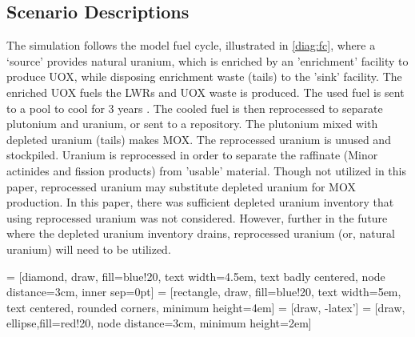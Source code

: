 \subsection{Scenario Descriptions}
The simulation follows the model fuel cycle, illustrated in \cref{diag:fc},
where a `source' provides natural uranium, which is enriched by an 'enrichment'
facility to produce \gls{UOX}, while disposing enrichment waste (tails)
to the 'sink' facility. The enriched \gls{UOX} fuels
the \gls{LWR}s and \gls{UOX} waste is produced. The used fuel
is sent to a pool to cool for 3 years \cite{carre_overview_2009}.
The cooled fuel is then reprocessed to separate plutonium and uranium,
or sent to a repository.
The plutonium mixed with depleted uranium (tails) makes \gls{MOX}.
The reprocessed uranium is unused and stockpiled. Uranium is reprocessed
in order to separate the raffinate (Minor actinides and fission products)
from 'usable' material. Though not utilized in this paper, reprocessed
uranium may substitute depleted uranium for \gls{MOX} production. In this
paper, there was sufficient depleted uranium inventory that using reprocessed
uranium was not considered. However, further in the future where the depleted
uranium inventory drains, reprocessed uranium (or, natural uranium) will need to be utilized. 


 = [diamond, draw, fill=blue!20, 
text width=4.5em, text badly centered, node distance=3cm, inner sep=0pt]
 = [rectangle, draw, fill=blue!20, 
text width=5em, text centered, rounded corners, minimum height=4em]
 = [draw, -latex']
 = [draw, ellipse,fill=red!20, node distance=3cm,
minimum height=2em]


